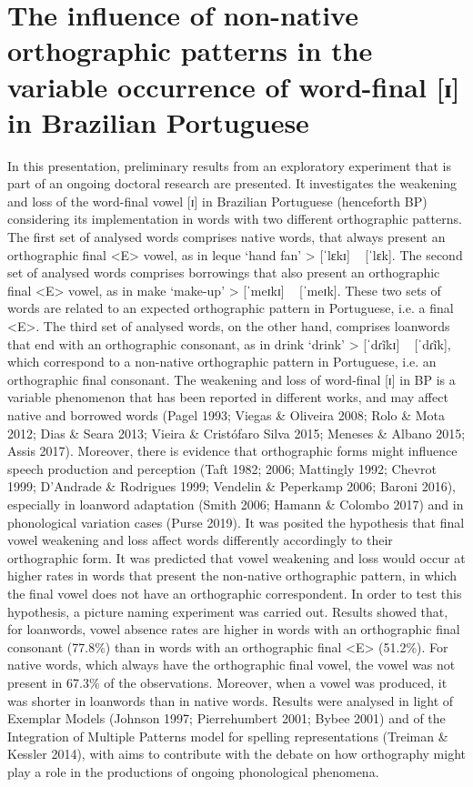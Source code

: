 \chapter{The influence of non-native orthographic patterns in the variable occurrence of word-final [ɪ] in Brazilian Portuguese}\label{ch:matheusfreita6}
\begin{affils}
\end{affils}

In this presentation, preliminary results from an exploratory experiment that is part of an ongoing doctoral research are presented. It investigates the weakening and loss of the word-final vowel [ɪ] in Brazilian Portuguese (henceforth BP) considering its implementation in words with two different orthographic patterns. The first set of analysed words comprises native words, that always present an orthographic final <E> vowel, as in leque ‘hand fan’ > [ˈlɛkɪ] ~ [ˈlɛk]. The second set of analysed words comprises borrowings that also present an orthographic final <E> vowel, as in make ‘make-up’ > [ˈmeɪkɪ] ~ [ˈmeɪk]. These two sets of words are related to an expected orthographic pattern in Portuguese, i.e. a final <E>. The third set of analysed words, on the other hand, comprises loanwords that end with an orthographic consonant, as in drink ‘drink’ > [ˈdɾĩkɪ] ~ [ˈdɾĩk], which correspond to a non-native orthographic pattern in Portuguese, i.e. an orthographic final consonant. The weakening and loss of word-final [ɪ] in BP is a variable phenomenon that has been reported in different works, and may affect native and borrowed words (Pagel 1993; Viegas \& Oliveira 2008; Rolo \& Mota 2012; Dias \& Seara 2013; Vieira \& Cristófaro Silva 2015; Meneses \& Albano 2015; Assis 2017). Moreover, there is evidence that orthographic forms might influence speech production and perception (Taft 1982; 2006; Mattingly 1992; Chevrot 1999; D’Andrade \& Rodrigues 1999; Vendelin \& Peperkamp 2006; Baroni 2016), especially in loanword adaptation (Smith 2006; Hamann \& Colombo 2017) and in phonological variation cases (Purse 2019). It was posited the hypothesis that final vowel weakening and loss affect words differently accordingly to their orthographic form. It was predicted that vowel weakening and loss would occur at higher rates in words that present the non-native orthographic pattern, in which the final vowel does not have an orthographic correspondent. In order to test this hypothesis, a picture naming experiment was carried out. Results showed that, for loanwords, vowel absence rates are higher in words with an orthographic final consonant (77.8\%) than in words with an orthographic final <E> (51.2\%). For native words, which always have the orthographic final vowel, the vowel was not present in 67.3\% of the observations. Moreover, when a vowel was produced, it was shorter in loanwords than in native words. Results were analysed in light of Exemplar Models (Johnson 1997; Pierrehumbert 2001; Bybee 2001) and of the Integration of Multiple Patterns model for spelling representations (Treiman \& Kessler 2014), with aims to contribute with the debate on how orthography might play a role in the productions of ongoing phonological phenomena.

